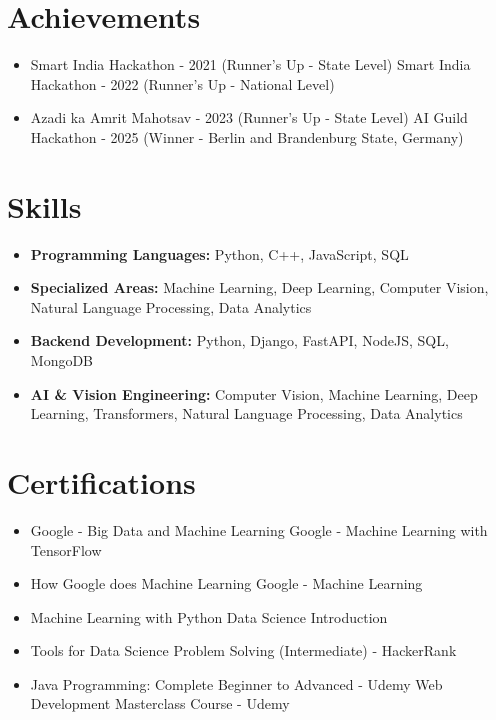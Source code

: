 \documentclass[a4paper,10pt]{article}
\begin{document}
\section*{Achievements}
\begin{itemize}
\item Smart India Hackathon - 2021 (Runner's Up - State Level) \hfill Smart India Hackathon - 2022 (Runner's Up - National Level)
\item Azadi ka Amrit Mahotsav - 2023 (Runner's Up - State Level) \hfill AI Guild Hackathon - 2025 (Winner - Berlin and Brandenburg State, Germany)
\end{itemize}

\section*{Skills}
\begin{itemize}
  \item \textbf{Programming Languages:} Python, C++, JavaScript, SQL
  \item \textbf{Specialized Areas:} Machine Learning, Deep Learning, Computer Vision, Natural Language Processing, Data Analytics
  \item \textbf{Backend Development:} Python, Django, FastAPI, NodeJS, SQL, MongoDB
  \item \textbf{AI \& Vision Engineering:} Computer Vision, Machine Learning, Deep Learning, Transformers, Natural Language Processing, Data Analytics
\end{itemize}

\section*{Certifications}
\begin{itemize}
\item Google - Big Data and Machine Learning \hfill Google - Machine Learning with TensorFlow
\item How Google does Machine Learning \hfill Google - Machine Learning
\item Machine Learning with Python \hfill Data Science Introduction
\item Tools for Data Science \hfill Problem Solving (Intermediate) - HackerRank
\item Java Programming: Complete Beginner to Advanced - Udemy \hfill Web Development Masterclass Course - Udemy
\end{itemize}
\end{document}
